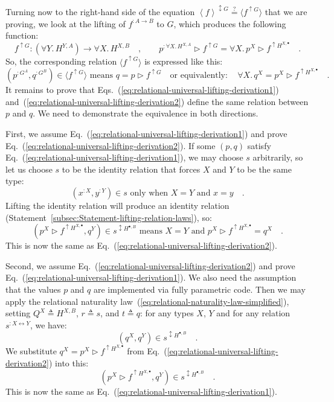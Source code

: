 Turning now to the right-hand side of the equation $\left<f\right>^{\updownarrow G}\overset{?}{=}\langle f^{\uparrow G}\rangle$
that we are proving, we look at the lifting of $f^{:A\rightarrow B}$
to $G$, which produces the following function:
\[
f^{\uparrow G}:(\forall Y.\,H^{Y,A})\rightarrow\forall X.\,H^{X,B}\quad,\quad\quad p^{:\forall X.\,H^{X,A}}\triangleright f^{\uparrow G}=\forall X.\,p^{X}\triangleright f^{\uparrow H^{X,\bullet}}\quad.
\]
So, the corresponding relation $\langle f^{\uparrow G}\rangle$ is
expressed like this:
\begin{equation}
(p^{:G^{A}},q^{:G^{B}})\in\langle f^{\uparrow G}\rangle\text{ means }q=p\triangleright f^{\uparrow G}\quad\text{or equivalently}:\quad\forall X.\,q^{X}=p^{X}\triangleright f^{\uparrow H^{X,\bullet}}\quad.\label{eq:relational-universal-lifting-derivation2}
\end{equation}
It remains to prove that Eqs.~(\ref{eq:relational-universal-lifting-derivation1})
and~(\ref{eq:relational-universal-lifting-derivation2}) define the
same relation between $p$ and $q$. We need to demonstrate the equivalence
in both directions. 

First, we assume Eq.~(\ref{eq:relational-universal-lifting-derivation1})
and prove Eq.~(\ref{eq:relational-universal-lifting-derivation2}).
If some $\left(p,q\right)$ satisfy Eq.~(\ref{eq:relational-universal-lifting-derivation1}),
we may choose $s$ arbitrarily, so let us choose $s$ to be the identity
relation that forces $X$ and $Y$ to be the same type:
\[
(x^{:X},y^{:Y})\in s\text{ only when }X=Y\text{ and }x=y\quad.
\]
Lifting the identity relation will produce an identity relation (Statement~\ref{subsec:Statement-lifting-relation-laws}),
so:
\[
(p^{X}\triangleright f^{\uparrow H^{X,\bullet}},q^{Y})\in s^{\updownarrow H^{\bullet,B}}\text{ means }X=Y\text{ and }p^{X}\triangleright f^{\uparrow H^{X,\bullet}}=q^{X}\quad.
\]
This is now the same as Eq.~(\ref{eq:relational-universal-lifting-derivation2}).

Second, we assume Eq.~(\ref{eq:relational-universal-lifting-derivation2})
and prove Eq.~(\ref{eq:relational-universal-lifting-derivation1}).
We also need the assumption that the values $p$ and $q$ are implemented
via fully parametric code. Then we may apply the relational naturality
law~(\ref{eq:relational-naturality-law-simplified}), setting $Q^{X}\triangleq H^{X,B}$,
$r\triangleq s$, and $t\triangleq q$: for any types $X$, $Y$ and
for any relation $s^{:X\leftrightarrow Y}$, we have:
\[
(q^{X},q^{Y})\in s^{\updownarrow H^{\bullet,B}}\quad.
\]
We substitute $q^{X}=p^{X}\triangleright f^{\uparrow H^{X,\bullet}}$
from Eq.~(\ref{eq:relational-universal-lifting-derivation2}) into
this:
\[
(p^{X}\triangleright f^{\uparrow H^{X,\bullet}},q^{Y})\in s^{\updownarrow H^{\bullet,B}}\quad.
\]
This is now the same as Eq.~(\ref{eq:relational-universal-lifting-derivation1}).

